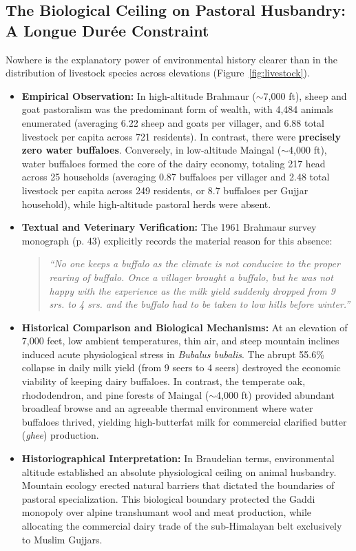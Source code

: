 \documentclass[11pt,a4paper]{article}
\begin{document}
\subsection{The Biological Ceiling on Pastoral Husbandry: A Longue Dur\'ee Constraint}
Nowhere is the explanatory power of environmental history clearer than in the distribution of livestock species across elevations (Figure~\ref{fig:livestock}).
\begin{itemize}[leftmargin=*]
    \item \textbf{Empirical Observation:} In high-altitude Brahmaur ($\sim$7,000 ft), sheep and goat pastoralism was the predominant form of wealth, with 4,484 animals enumerated (averaging 6.22 sheep and goats per villager, and 6.88 total livestock per capita across 721 residents). In contrast, there were \textbf{precisely zero water buffaloes}. Conversely, in low-altitude Maingal ($\sim$4,000 ft), water buffaloes formed the core of the dairy economy, totaling 217 head across 25 households (averaging 0.87 buffaloes per villager and 2.48 total livestock per capita across 249 residents, or 8.7 buffaloes per Gujjar household), while high-altitude pastoral herds were absent.
    \item \textbf{Textual and Veterinary Verification:} The 1961 Brahmaur survey monograph (p. 43) explicitly records the material reason for this absence:
    \begin{quote}
    \textit{``No one keeps a buffalo as the climate is not conducive to the proper rearing of buffalo. Once a villager brought a buffalo, but he was not happy with the experience as the milk yield suddenly dropped from 9 srs. to 4 srs. and the buffalo had to be taken to low hills before winter.''}
    \end{quote}
    \item \textbf{Historical Comparison and Biological Mechanisms:} At an elevation of 7,000 feet, low ambient temperatures, thin air, and steep mountain inclines induced acute physiological stress in \textit{Bubalus bubalis}. The abrupt 55.6\% collapse in daily milk yield (from 9 seers to 4 seers) destroyed the economic viability of keeping dairy buffaloes. In contrast, the temperate oak, rhododendron, and pine forests of Maingal ($\sim$4,000 ft) provided abundant broadleaf browse and an agreeable thermal environment where water buffaloes thrived, yielding high-butterfat milk for commercial clarified butter (\textit{ghee}) production.
    \item \textbf{Historiographical Interpretation:} In Braudelian terms, environmental altitude established an absolute physiological ceiling on animal husbandry. Mountain ecology erected natural barriers that dictated the boundaries of pastoral specialization. This biological boundary protected the Gaddi monopoly over alpine transhumant wool and meat production, while allocating the commercial dairy trade of the sub-Himalayan belt exclusively to Muslim Gujjars.

\end{itemize}
\end{document}
